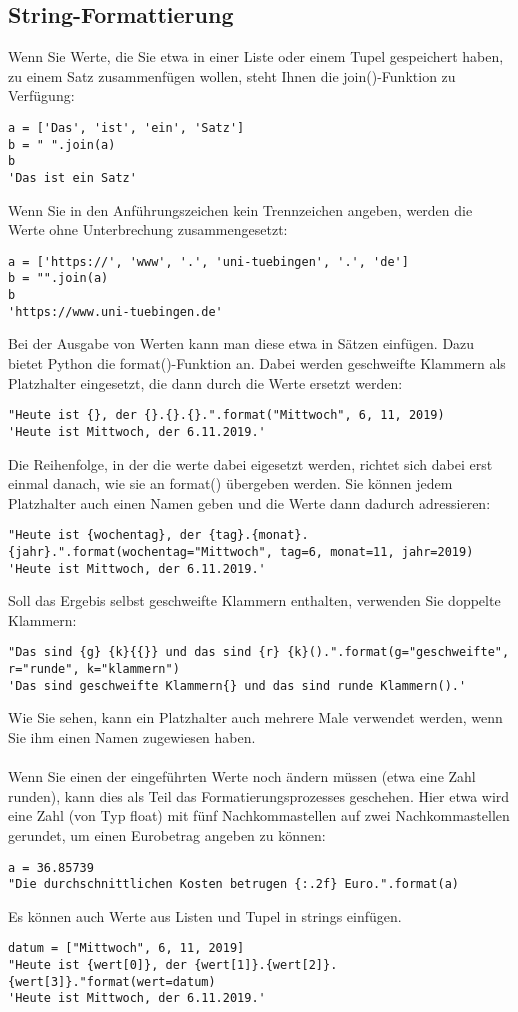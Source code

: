 \documentclass{article}
\begin{document}
\newpage

\subsection{String-Formattierung}
Wenn Sie Werte, die Sie etwa in einer Liste oder einem Tupel gespeichert haben, zu einem Satz zusammenfügen wollen, steht Ihnen die join()-Funktion zu Verfügung:
\begin{verbatim}
a = ['Das', 'ist', 'ein', 'Satz']
b = " ".join(a)
b
'Das ist ein Satz'
\end{verbatim}
Wenn Sie in den Anführungszeichen kein Trennzeichen angeben, werden die Werte ohne Unterbrechung zusammengesetzt:
\begin{verbatim}
a = ['https://', 'www', '.', 'uni-tuebingen', '.', 'de']
b = "".join(a)
b
'https://www.uni-tuebingen.de'
\end{verbatim}
Bei der Ausgabe von Werten kann man diese etwa in Sätzen einfügen. Dazu bietet Python die format()-Funktion an. Dabei werden geschweifte Klammern {} als Platzhalter eingesetzt, die dann durch die Werte ersetzt werden:
\begin{verbatim}
"Heute ist {}, der {}.{}.{}.".format("Mittwoch", 6, 11, 2019)
'Heute ist Mittwoch, der 6.11.2019.'
\end{verbatim}
Die Reihenfolge, in der die werte dabei eigesetzt werden, richtet sich dabei erst einmal danach, wie sie an format() übergeben werden. Sie können jedem Platzhalter auch einen Namen geben und die Werte dann dadurch adressieren:
\begin{verbatim}
"Heute ist {wochentag}, der {tag}.{monat}.{jahr}.".format(wochentag="Mittwoch", tag=6, monat=11, jahr=2019)
'Heute ist Mittwoch, der 6.11.2019.'
\end{verbatim}
Soll das Ergebis selbst geschweifte Klammern enthalten, verwenden Sie doppelte Klammern:
\begin{verbatim}
"Das sind {g} {k}{{}} und das sind {r} {k}().".format(g="geschweifte", r="runde", k="klammern")
'Das sind geschweifte Klammern{} und das sind runde Klammern().'
\end{verbatim}
Wie Sie sehen, kann ein Platzhalter auch mehrere Male verwendet werden, wenn Sie ihm einen Namen zugewiesen haben.\\\\
Wenn Sie einen der eingeführten Werte noch ändern müssen (etwa eine Zahl runden), kann dies als Teil das Formatierungsprozesses geschehen. Hier etwa wird eine Zahl (von Typ float) mit fünf Nachkommastellen auf zwei Nachkommastellen gerundet, um einen Eurobetrag angeben zu können:\\
\begin{verbatim}
a = 36.85739
"Die durchschnittlichen Kosten betrugen {:.2f} Euro.".format(a)
\end{verbatim}
Es können auch Werte aus Listen und Tupel in strings einfügen.
\begin{verbatim}
datum = ["Mittwoch", 6, 11, 2019]
"Heute ist {wert[0]}, der {wert[1]}.{wert[2]}.{wert[3]}."format(wert=datum)
'Heute ist Mittwoch, der 6.11.2019.'
\end{verbatim}
\end{document}
